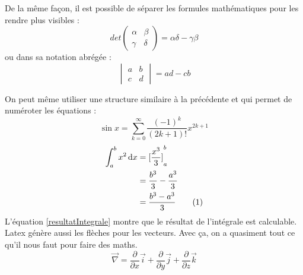 \documentclass[10pt,a4paper]{report} %
\newcommand\numberthis{\addtocounter{equation}{1}\tag{\theequation}} %
\begin{document}
De la même façon, il est possible de séparer les formules mathématiques pour les rendre plus visibles :
\begin{displaymath}
	det \begin{pmatrix}
	\alpha & \beta \\
	\gamma & \delta
	\end{pmatrix} = \alpha\delta - \gamma\beta 
\end{displaymath} ou dans sa notation abrégée : 
$$
\begin{vmatrix} 
	a & b \\
	c & d 
\end{vmatrix} = ad - cb
$$

On peut même utiliser une structure similaire à la précédente et qui permet de numéroter les équations : \begin{equation}
\sin x=\sum_{k=0}^{\infty}\frac{(-1)^k}{(2k+1)!}x^{2k+1}
\end{equation}
\begin{align*}
	\int_a^b x^2 \, \mathrm dx & = {\lbrack \frac{x^3}{3} \rbrack}_a^b                     \\
	                           & = \frac{b^3}{3} - \frac{a^3}{3}                           \\
	                           & = \frac{b^3-a^3}{3} \numberthis \label{resultatIntegrale} 
\end{align*}
L'équation \eqref{resultatIntegrale} montre que le résultat de l'intégrale est calculable.
\medbreak
Latex génère aussi les flèches pour les vecteurs. Avec ça, on a quasiment tout ce qu'il nous faut pour faire des maths.
$$
\overrightarrow{\nabla }=\frac{\partial }{\partial x}\overrightarrow{i}+\frac{\partial }{\partial y}\overrightarrow{j}+\frac{\partial }{\partial z}
\overrightarrow{k}
$$
\end{document}
